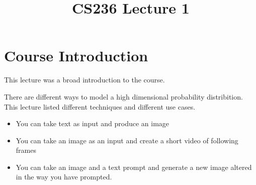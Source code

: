\documentclass{article}
\title{CS236 Lecture 1}
\begin{document}
\maketitle
\section{Course Introduction}
This lecture was a broad introduction to the course.

There are different ways to model a high dimensional probability distribition.
This lecture listed different techniques and different use cases.

\begin{itemize}
    \item You can take text as input and produce an image
    \item You can take an image as an input and create a short video of following frames
    \item You can take an image and a text prompt and generate a new image altered in the way you have prompted.
  \end{itemize}
\end{document}
